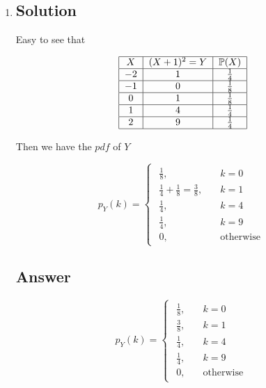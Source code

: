 \documentclass[12pt]{article}
\newcommand{\bP}{\mathbb{P}}
\begin{document}
	\begin{enumerate}[label={},leftmargin=0in]\item
		\subsection*{Solution}
		
			Easy to see that
			
			\[
				\begin{tabular}{|c|c|c|}
					\hline
					$X$  & $(X+1)^2=Y$ & $\bP(X)$       \\ \hline
					$-2$ & $1$         & $\frac{1}{4}$  \\ \hline
					$-1$ & $0$         & $\frac{1}{8}$  \\ \hline
					$0$  & $1$         & $\frac{1}{8}$  \\ \hline
					$1$  & $4$         & $\frac{1}{4}$  \\ \hline
					$2$  & $9$         & $\frac{1}{4}$  \\ \hline
				\end{tabular}
			\]
			
			Then we have the $pdf$ of $Y$
			
			\[
				p_Y(k) =
				\begin{cases}
					\begin{aligned}
						\frac{1}{8}, &\quad k = 0\\
						\frac{1}{4} + \frac{1}{8} = \frac{3}{8}, &\quad k = 1\\
						\frac{1}{4}, &\quad k = 4\\
						\frac{1}{4}, &\quad k = 9\\
						0, &\quad \text{otherwise}
					\end{aligned}
				\end{cases}
			\]
		
		\subsection*{Answer}
		
			\[\boxed{p_Y(k) =
				\begin{cases}
					\begin{aligned}
						\frac{1}{8}, &\quad k = 0\\
						\frac{3}{8}, &\quad k = 1\\
						\frac{1}{4}, &\quad k = 4\\
						\frac{1}{4}, &\quad k = 9\\
						0, &\quad \text{otherwise}
					\end{aligned}
			\end{cases}}\]
	\end{enumerate}
	
\end{document}
